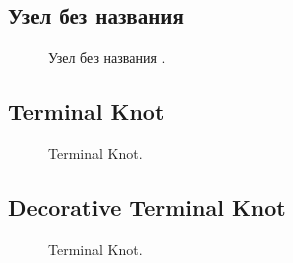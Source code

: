 \addtocounter{KnotNoName}{1}

\subsection{Узел без названия }

\begin{figure}[H]\centering
	\begin{minipage}{1\linewidth}
		\begin{center}
			\tcbox[enhanced jigsaw,colframe=black,opacityframe=0.5,opacityback=0.5]
			{\centering{}}
		\end{center}
	\end{minipage}
\caption{Узел без названия .}
\label{ris:KnotNoName_16}
\end{figure}

\subsection{Terminal Knot}

\begin{figure}[H]\centering
	\begin{minipage}{1\linewidth}
		\begin{center}
			\tcbox[enhanced jigsaw,colframe=black,opacityframe=0.5,opacityback=0.5]
			{\centering{}}
		\end{center}
	\end{minipage}
\caption{Terminal Knot.}
\label{ris:Decorative_Terminal}
\end{figure}

\subsection{Decorative Terminal Knot}

\begin{figure}[H]\centering
	\begin{minipage}{1\linewidth}
		\begin{center}
			\tcbox[enhanced jigsaw,colframe=black,opacityframe=0.5,opacityback=0.5]
			{\centering{}}
		\end{center}
	\end{minipage}
\caption{Terminal Knot.}
\label{ris:Decorative_Terminal_1}
\end{figure}

